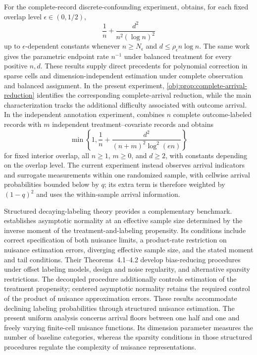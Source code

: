 For the complete-record discrete-confounding experiment, \citet[Sharp fixed-interior minimax theorem]{CausalSmith2026} obtains, for each fixed overlap level \(\epsilon\in(0,1/2)\),
\[
\frac1n+\frac{d^2}{n^2(\log n)^2}
\]
up to \(\epsilon\)-dependent constants whenever \(n\ge N_\epsilon\) and \(d\le\rho_\epsilon n\log n\). The same work gives the parametric endpoint rate \(n^{-1}\) under balanced treatment for every positive \(n,d\). These results supply direct precedents for polynomial correction in sparse cells and dimension-independent estimation under complete observation and balanced assignment. In the present experiment, \cref{obj:prop:complete-arrival-reduction} identifies the corresponding complete-arrival reduction, while the main characterization tracks the additional difficulty associated with outcome arrival. In the independent annotation experiment, \citet[Sharp annotation frontier theorem]{CausalSmith2026Annotation} combines \(n\) complete outcome-labeled records with \(m\) independent treatment--covariate records and obtains
\[
\min\left\{1,\frac1n+\frac{d^2}{(n+m)^2\log^2(en)}\right\}
\]
for fixed interior overlap, all \(n\ge1\), \(m\ge0\), and \(d\ge2\), with constants depending on the overlap level. The current experiment instead observes arrival indicators and surrogate measurements within one randomized sample, with cellwise arrival probabilities bounded below by \(q\); its extra term is therefore weighted by \((1-q)^2\) and uses the within-sample arrival information.

Structured decaying-labeling theory provides a complementary benchmark. \citet[Theorem~2.2 and equation~(2.4)]{ZhangChakraborttyBradic2025} establishes asymptotic normality at an effective sample size determined by the inverse moment of the treatment-and-labeling propensity. Its conditions include correct specification of both nuisance limits, a product-rate restriction on nuisance estimation errors, diverging effective sample size, and the stated moment and tail conditions. Their Theorems~4.1--4.2 develop bias-reducing procedures under offset labeling models, design and noise regularity, and alternative sparsity restrictions. The decoupled procedure additionally controls estimation of the treatment propensity; centered asymptotic normality retains the required control of the product of nuisance approximation errors. These results accommodate declining labeling probabilities through structured nuisance estimation. The present uniform analysis concerns arrival floors between one half and one and freely varying finite-cell nuisance functions. Its dimension parameter measures the number of baseline categories, whereas the sparsity conditions in those structured procedures regulate the complexity of nuisance representations.

